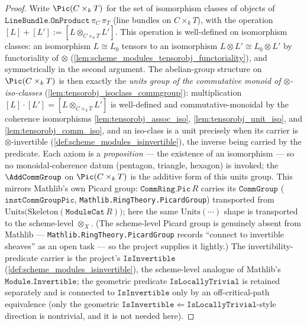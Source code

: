 \begin{proof}
  \leanok
  Write \(\Pic(C \times_k T)\) for the set of isomorphism classes of objects
  of \(\texttt{LineBundle.OnProduct}\,\pi_C\,\pi_T\) (line bundles on
  \(C \times_k T\)), with the operation
  \([L] + [L'] := [L \otimes_{C \times_k T} L']\). This operation is
  well-defined on isomorphism classes: an isomorphism \(L \cong L_0\) tensors
  to an isomorphism \(L \otimes L' \cong L_0 \otimes L'\) by functoriality of
  \(\otimes\) (\cref{lem:scheme_modules_tensorobj_functoriality}), and
  symmetrically in the second argument. The abelian-group structure on
  \(\Pic(C \times_k T)\) is then exactly the \emph{units group of the
  commutative monoid of \(\otimes\)-iso-classes}
  (\cref{lem:tensorobj_isoclass_commgroup}): multiplication
  \([L]\cdot[L'] = [L \otimes_{C\times_k T} L']\) is well-defined and
  commutative-monoidal by the coherence isomorphisms
  \cref{lem:tensorobj_assoc_iso}, \cref{lem:tensorobj_unit_iso}, and
  \cref{lem:tensorobj_comm_iso},
  and an iso-class is a unit precisely when its carrier is
  \(\otimes\)-invertible (\cref{def:scheme_modules_isinvertible}), the inverse
  being carried by the predicate. Each axiom is a \emph{proposition} --- the
  existence of an isomorphism --- so no monoidal-coherence datum (pentagon,
  triangle, hexagon) is invoked; the \(\AddCommGroup\) on
  \(\Pic(C \times_k T)\) is the additive form of this units group. This mirrors
  Mathlib's own Picard group: \(\mathtt{CommRing.Pic}\,R\) carries its
  \(\mathtt{CommGroup}\) (\(\mathtt{instCommGroupPic}\),
  \texttt{Mathlib.RingTheory.PicardGroup}) transported from
  \(\mathrm{Units}\bigl(\mathrm{Skeleton}(\mathtt{ModuleCat}\,R)\bigr)\); here
  the same \(\mathrm{Units}(\cdots)\) shape is transported to the scheme-level
  \(\otimes_X\). (The scheme-level Picard group is genuinely absent from
  Mathlib --- \texttt{Mathlib.RingTheory.PicardGroup} records ``connect to
  invertible sheaves'' as an open task --- so the project supplies it lightly.)
  The invertibility-predicate carrier is the project's \(\mathtt{IsInvertible}\)
  (\cref{def:scheme_modules_isinvertible}), the scheme-level analogue of
  Mathlib's \(\mathtt{Module.Invertible}\); the geometric predicate
  \(\mathtt{IsLocallyTrivial}\) is retained separately and is connected to
  \(\mathtt{IsInvertible}\) only by an off-critical-path equivalence (only the
  geometric \(\mathtt{IsInvertible} \Leftarrow \mathtt{IsLocallyTrivial}\)-style
  direction is nontrivial, and it is not needed here).


\end{proof}
